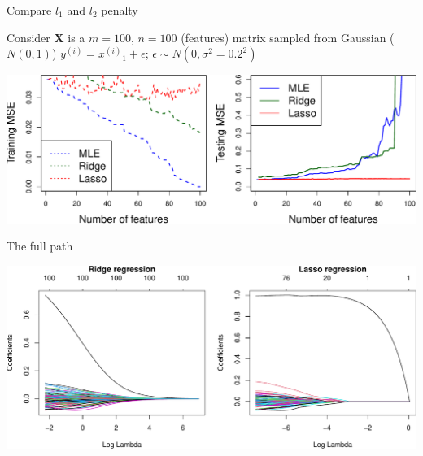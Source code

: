\documentclass[ignorenonframetext,aspectratio=169]{beamer}
\newcommand{\vv}[1]{\boldsymbol{#1}}
\newcommand{\di}[2]{\ensuremath{ #1^{(#2)}}}
\begin{document}
\begin{frame}{Compare \(l_1\) and \(l_2\) penalty}
\protect\hypertarget{compare-l_1-and-l_2-penalty-1}{}

Consider \(\vv{X}\) is a \(m=100\), \(n=100\) (features) matrix sampled
from Gaussian (\(N(0,1)\)) \(\di{y}{i}= \di{x}{i}_1 + \epsilon\);
\(\epsilon \sim N(0, \sigma^2=0.2^2)\)

\begin{center}\includegraphics[width=1\linewidth]{lecture10_files/figure-beamer/unnamed-chunk-26-1} \end{center}

\end{frame}

\begin{frame}{The full path}
\protect\hypertarget{the-full-path}{}

\begin{center}\includegraphics[width=1\linewidth]{lecture10_files/figure-beamer/unnamed-chunk-27-1} \end{center}

\end{frame}
\end{document}
